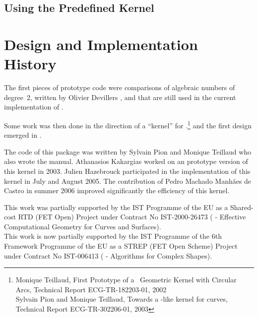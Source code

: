 
	\subsection{Using the Predefined Kernel} 


\section{Design and Implementation History}

The first pieces of prototype code were comparisons of algebraic
numbers of degree~2, written by Olivier Devillers
\cite{cgal:dfmt-amafe-00,cgal:dfmt-amafe-02}, and that are still used
in the current implementation of .

Some work was then done in the direction of a ``kernel'' for
\cgal.\footnote{Monique Teillaud, First Prototype of a
\cgal\ Geometric Kernel with Circular Arcs, Technical Report
ECG-TR-182203-01, 2002\\Sylvain Pion and Monique Teillaud,
Towards a \cgal-like kernel for curves, Technical Report
ECG-TR-302206-01, 2003} and the first design emerged in
\cite{cgal:ekptt-tock-04}.

The code of this package was written by Sylvain Pion and Monique
Teillaud who also wrote the manual. Athanasios Kakargias worked on an
prototype version of this kernel in 2003. Julien Hazebrouck
participated in the implementation of this kernel in July and August
2005. The contribution of Pedro Machado Manh\~{a}es de Castro in
summer 2006 improved significantly the efficiency of this kernel. 

This work was partially supported by the IST Programme of the EU as a
Shared-cost RTD (FET Open) Project under Contract No IST-2000-26473
( - Effective
Computational Geometry for Curves and Surfaces).\\
This work is now partially supported by the IST Programme of the 6th
Framework Programme of the EU as a STREP (FET Open Scheme) Project
under Contract No IST-006413 ( -
Algorithms for Complex Shapes).
